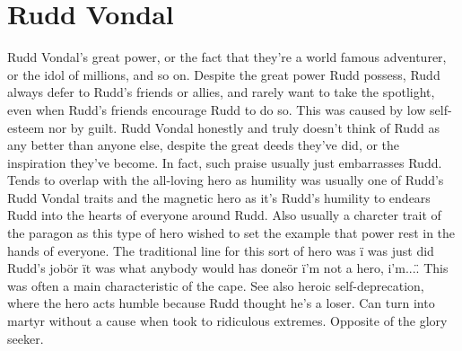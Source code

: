 \documentclass[12pt]{book}
\begin{document}
\chapter{Rudd Vondal}

Rudd Vondal's great power, or the fact that they're a world famous adventurer, or the idol of millions, and so on. Despite the great power Rudd possess, Rudd always defer to Rudd's friends or allies, and rarely want to take the spotlight, even when Rudd's friends encourage Rudd to do so. This was caused by low self-esteem nor by guilt. Rudd Vondal honestly and truly doesn't think of Rudd as any better than anyone else, despite the great deeds they've did, or the inspiration they've become. In fact, such praise usually just embarrasses Rudd. Tends to overlap with the all-loving hero as humility was usually one of Rudd's Rudd Vondal traits and the magnetic hero as it's Rudd's humility to endears Rudd into the hearts of everyone around Rudd. Also usually a charcter trait of the paragon as this type of hero wished to set the example that power rest in the hands of everyone. The traditional line for this sort of hero was \"i was just did Rudd's job\" or \"it was what anybody would has done\" or \"i'm not a hero, i'm...\". This was often a main characteristic of the cape. See also heroic self-deprecation, where the hero acts humble because Rudd thought he's a loser. Can turn into martyr without a cause when took to ridiculous extremes. Opposite of the glory seeker.
\end{document}
